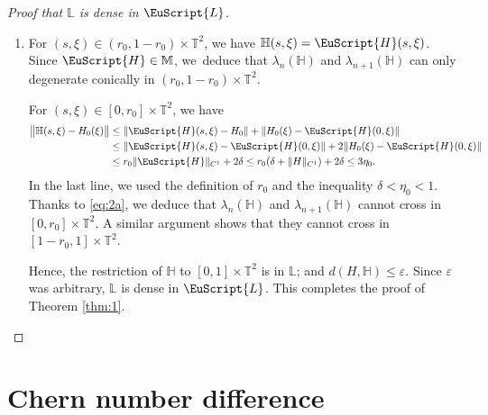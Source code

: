\documentclass[JEP,XML,SOM,Unicode,NoFloatCountersInSection]{cedram}
\let\pazocal\EuScript
\theoremstyle{definition}
\newcommand{\LL}{{\pazocal{L}}}
\newcommand{\HH}{\pazocal{H}}
\newcommand{\Hh}{{\mathbb{H}}}
\newcommand{\Ll}{\mathbb{L}}
\newcommand{\Mm}{\mathbb{M}}
\newcommand{\Tt}{{\mathbb{T}}}
\let\epsi\varepsilon
\begin{document}
\begin{proof}[Proof that $\Ll$ is dense in $\LL$]
\begin{enumerate}
\item
For $(s,\xi) \in (r_0,1-r_0) \times \Tt^2$, we have $\Hh(s,\xi) = \HH(s,\xi)$. Since $\HH \in \Mm$, we~deduce that $\lambda_n(\Hh)$ and $\lambda_{n+1}(\Hh)$ can only degenerate conically in $(r_0,1-r_0) \times \Tt^2$.

For $(s,\xi) \in [0,r_0] \times \Tt^2$, we have
\[
\begin{split}
\big\| \Hh(s,\xi) - H_0(\xi) \big\| &\leq \| \HH(s,\xi)-H_0 \| + \| H_0(\xi) -\HH(0,\xi) \|
\\
&\leq \| \HH(s,\xi)-\HH(0,\xi) \| + 2\| H_0(\xi) -\HH(0,\xi) \|
\\
&\leq r_0 \| \HH \|_{C^1} + 2 \delta \leq r_0 (\delta + \|H\|_{C^1}) + 2 \delta \leq 3\eta_0.
\end{split}
\]
In the last line, we used the definition of $r_0$ and the inequality $\delta < \eta_0 < 1$. Thanks to \eqref{eq:2a}, we deduce that $\lambda_n(\Hh)$ and $\lambda_{n+1}(\Hh)$ cannot cross in $[0,r_0] \times \Tt^2$. A similar argument shows that they cannot cross in $[1-r_0,1] \times \Tt^2$.

Hence, the restriction of $\Hh$ to $[0,1] \times \Tt^2$ is in $\Ll$; and $d(H,\Hh) \leq \epsi$. Since $\epsi$ was arbitrary, $\Ll$ is dense in $\LL$. This completes the proof of Theorem \ref{thm:1}.\qedhere
\end{enumerate}
\end{proof}

\section{Chern number difference}\label{sec:5}
\end{document}
